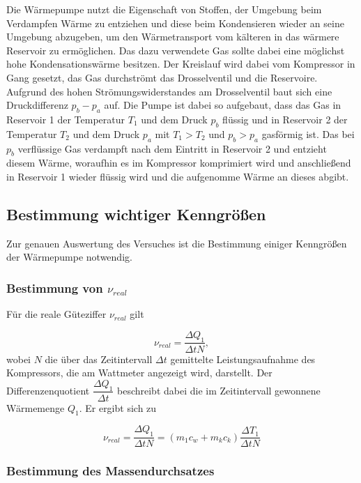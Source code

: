 Die Wärmepumpe nutzt die Eigenschaft von Stoffen, der Umgebung beim Verdampfen Wärme zu entziehen und diese beim Kondensieren wieder an seine Umgebung abzugeben, um den Wärmetransport vom kälteren in das wärmere Reservoir
zu ermöglichen. Das dazu verwendete Gas sollte dabei eine möglichst hohe Kondensationswärme besitzen. Der Kreislauf wird dabei vom Kompressor in Gang gesetzt, das Gas durchströmt das Drosselventil und die Reservoire.
Aufgrund des hohen Strömungswiderstandes am Drosselventil baut sich eine Druckdifferenz $p_b-p_a$ auf.
Die Pumpe ist dabei so aufgebaut, dass das Gas in Reservoir 1 der Temperatur $T_1$ und dem Druck $p_b$ flüssig und in Reservoir 2 der Temperatur $T_2$ und dem Druck $p_a$ mit $T_1 > T_2$ und $p_b > p_a$ gasförmig ist.
Das bei $p_b$ verflüssige Gas verdampft nach dem Eintritt in Reservoir 2 und entzieht diesem Wärme, woraufhin es im Kompressor komprimiert wird und anschließend in Reservoir 1 wieder flüssig wird und die aufgenomme Wärme
an dieses abgibt.

\subsection{Bestimmung wichtiger Kenngrößen}

Zur genauen Auswertung des Versuches ist die Bestimmung einiger Kenngrößen der Wärmepumpe notwendig.

\subsubsection{Bestimmung von $ν_{real}$}

Für die reale Güteziffer $ν_{real}$ gilt

\begin{equation}
    ν_{real} = \dfrac{ΔQ_1}{ΔtN},
\end{equation}
wobei $N$ die über das Zeitintervall $Δt$ gemittelte Leistungsaufnahme des Kompressors, die am Wattmeter angezeigt wird, darstellt. 
Der Differenzenquotient $\dfrac{ΔQ_1}{Δt}$ beschreibt dabei die im Zeitintervall gewonnene Wärmemenge $Q_1$. Er ergibt sich zu

\begin{equation}
    ν_{real} = \dfrac{ΔQ_1}{ΔtN} = (m_1c_w + m_kc_k)\dfrac{ΔT_1}{ΔtN}
    \label{eq:effrealdiffquo}
\end{equation}

\subsubsection{Bestimmung des Massendurchsatzes}

